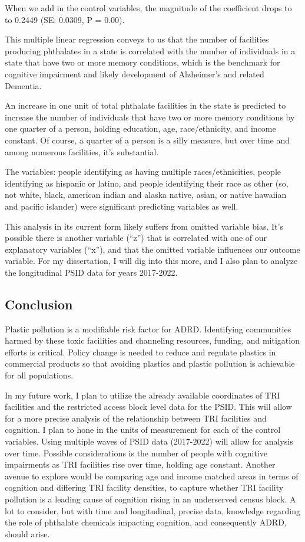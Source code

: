 \documentclass[
]{article}
\begin{document}
When we add in the control variables, the magnitude of the coefficient
drops to to 0.2449 (SE: 0.0309, P = 0.00).

This multiple linear regression conveys to us that the number of
facilities producing phthalates in a state is correlated with the number
of individuals in a state that have two or more memory conditions, which
is the benchmark for cognitive impairment and likely development of
Alzheimer's and related Dementia.

An increase in one unit of total phthalate facilities in the state is
predicted to increase the number of individuals that have two or more
memory conditions by one quarter of a person, holding education, age,
race/ethnicity, and income constant. Of course, a quarter of a person is
a silly measure, but over time and among numerous facilities, it's
substantial.

The variables: people identifying as having multiple races/ethnicities,
people identifying as hispanic or latino, and people identifying their
race as other (so, not white, black, american indian and alaska native,
asian, or native hawaiian and pacific islander) were significant
predicting variables as well.

This analysis in its current form likely suffers from omitted variable
bias. It's possible there is another variable (``z'') that is correlated
with one of our explanatory variables (``x''), and that the omitted
variable influences our outcome variable. For my dissertation, I will
dig into this more, and I also plan to analyze the longitudinal PSID
data for years 2017-2022.

\hypertarget{conclusion}{%
\subsection{Conclusion}\label{conclusion}}

Plastic pollution is a modifiable risk factor for ADRD. Identifying
communities harmed by these toxic facilities and channeling resources,
funding, and mitigation efforts is critical. Policy change is needed to
reduce and regulate plastics in commercial products so that avoiding
plastics and plastic pollution is achievable for all populations.

In my future work, I plan to utilize the already available coordinates
of TRI facilities and the restricted access block level data for the
PSID. This will allow for a more precise analysis of the relationship
between TRI facilities and cognition. I plan to hone in the units of
measurement for each of the control variables. Using multiple waves of
PSID data (2017-2022) will allow for analysis over time. Possible
considerations is the number of people with cognitive impairments as TRI
facilities rise over time, holding age constant. Another avenue to
explore would be comparing age and income matched areas in terms of
cognition and differing TRI facility densities, to capture whether TRI
facility pollution is a leading cause of cognition rising in an
underserved census block. A lot to consider, but with time and
longitudinal, precise data, knowledge regarding the role of phthalate
chemicals impacting cognition, and consequently ADRD, should arise.
\end{document}
